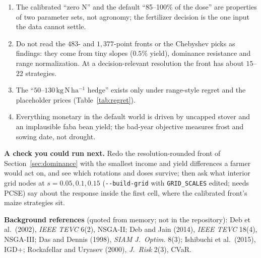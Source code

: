 \documentclass[11pt,a4paper]{article}
\newcommand{\code}[1]{\texttt{\nolinkurl{#1}}}
\newcommand{\kgNha}{\mathrm{kg\,N\,ha^{-1}}}
\begin{document}
\begin{enumerate}
\item The calibrated ``zero N'' and the default ``85--100\% of the dose'' are properties of two parameter sets, not agronomy; the fertilizer decision is the one input the data cannot settle.
\item Do not read the $483$- and $1{,}377$-point fronts or the Chebyshev picks as findings: they come from tiny slopes ($0.5\%$ yield), dominance resistance and range normalization. At a decision-relevant resolution the front has about $15$--$22$ strategies.
\item The ``$50$--$130\,\kgNha$ hedge'' exists only under range-style regret and the placeholder prices (Table~\ref{tab:regret}).
\item Everything monetary in the default world is driven by uncapped stover and an implausible faba bean yield; the bad-year objective measures frost and sowing date, not drought.
\end{enumerate}

\textbf{A check you could run next.} Redo the resolution-rounded front of Section~\ref{sec:dominance} with the smallest income and yield differences a farmer would act on, and see which rotations and doses survive; then ask what interior grid nodes at $s=0.05,0.1,0.15$ (\code{--build-grid} with \code{GRID_SCALES} edited; needs PCSE) say about the response inside the first cell, where the calibrated front's maize strategies sit.

\textbf{Background references} (quoted from memory; not in the repository): Deb et al.\ (2002), \emph{IEEE TEVC} 6(2), NSGA-II; Deb and Jain (2014), \emph{IEEE TEVC} 18(4), NSGA-III; Das and Dennis (1998), \emph{SIAM J.\ Optim.} 8(3); Ishibuchi et al.\ (2015), IGD+; Rockafellar and Uryasev (2000), \emph{J.\ Risk} 2(3), CVaR.
\end{document}
